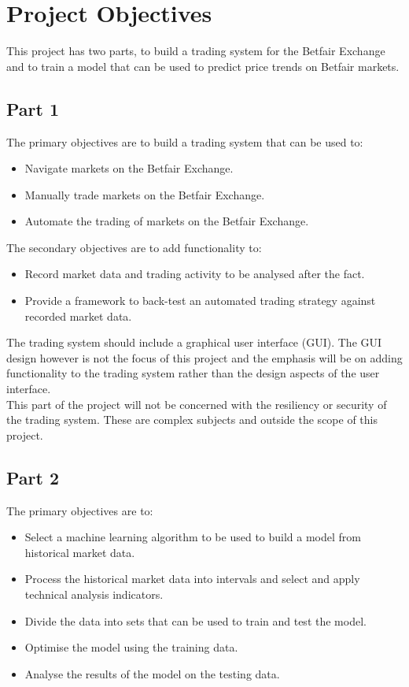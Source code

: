 \section{Project Objectives}
	This project has two parts, to build a trading system for the Betfair Exchange and to train a model that can be used to predict price trends on Betfair markets.

	\subsection{Part 1}
	The primary objectives are to build a trading system that can be used to:
	
	\begin{itemize}
		\item Navigate markets on the Betfair Exchange.
		\item Manually trade markets on the Betfair Exchange.
		\item Automate the trading of markets on the Betfair Exchange.
	\end{itemize}

	The secondary objectives are to add functionality to:
		
	\begin{itemize}
		\item Record market data and trading activity to be analysed after the fact.
		\item Provide a framework to back-test an automated trading strategy against recorded market data.
	\end{itemize}

	The trading system should include a graphical user interface (GUI). The GUI design however is not the focus of this project and the emphasis will be on adding functionality to the trading system rather than the design aspects of the user interface.\\
	
	This part of the project will not be concerned with the resiliency or security of the trading system. These are complex subjects and outside the scope of this project.
			
	\subsection{Part 2}
	The primary objectives are to:
	
	\begin{itemize}
		\item Select a machine learning algorithm to be used to build a model from historical market data.
		\item Process the historical market data into intervals and select and apply technical analysis indicators.
		\item Divide the data into sets that can be used to train and test the model.
		\item Optimise the model using the training data.
		\item Analyse the results of the model on the testing data.
	\end{itemize}
	
